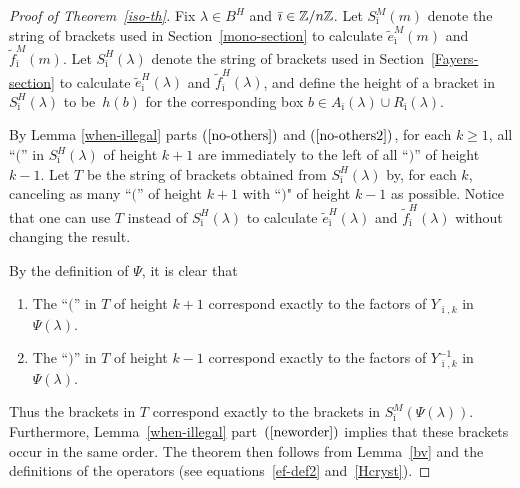 \documentclass[11pt]{article}
\theoremstyle{definition}
\newcommand{\bz}{\Bbb{Z}}
\begin{document}
\begin{proof}[Proof of Theorem~\ref{iso-th}]
Fix $\lambda \in B^H$ and $\bar \imath \in \bz/n\bz$. Let $S^M_{\bar \imath}(m)$ denote the string of brackets used in Section~\ref{mono-section} to calculate $\tilde e_{\bar \imath}^M(m)$ and $\tilde f_{\bar \imath}^M(m)$.
Let $S_{\bar \imath}^H(\lambda)$ denote the string of brackets used in Section~\ref{Fayers-section} to calculate  $\tilde e_{\bar \imath}^H(\lambda)$ and $\tilde f_{\bar \imath}^H(\lambda)$, and def\/ine the height of a bracket in $S^H_{\bar \imath}(\lambda)$ to be~$h(b)$ for the corresponding box $b \in A_{\bar \imath}(\lambda) \cup R_{\bar \imath}(\lambda)$.


By Lemma \ref{when-illegal} parts $(\ref{no-others})$ and $(\ref{no-others2})$, for each $k \geq 1$, all ``$($''  in $S^H_{\bar \imath}(\lambda)$ of height $k+1$ are immediately to the left of all ``$)$'' of height $k-1$.  Let $T$ be the string of brackets obtained from $S^H_{\bar \imath}(\lambda)$ by, for each $k$, canceling as many ``$($'' of height $k+1$ with ``$)$" of height $k-1$ as possible. Notice that one can use $T$ instead of $S^H_{\bar \imath}(\lambda)$ to calculate $\tilde e_{\bar \imath}^H(\lambda)$ and $\tilde f_{\bar \imath}^H(\lambda)$ without changing the result.

By the def\/inition of $\Psi$, it is clear that
\begin{enumerate}\itemsep=0pt
\item The ``$($'' in $T$ of height $k+1$ correspond exactly to the factors of $Y_{\bar \imath, k}$ in $\Psi(\lambda)$.

\item The ``$)$'' in $T$ of height $k-1$ correspond exactly to the factors of $Y_{\bar \imath, k}^{-1}$ in $\Psi(\lambda)$.
\end{enumerate}

Thus the brackets in $T$ correspond exactly to the brackets in $S^M_{\bar \imath}(\Psi(\lambda))$. Furthermore, Lemma~\ref{when-illegal} part~$(\ref{neworder})$ implies that these brackets occur in the same order. The theorem then follows from Lemma~\ref{bv} and the def\/initions of the operators (see equations~\eqref{ef-def2} and~\eqref{Hcryst}).
\end{proof}
\end{document}
